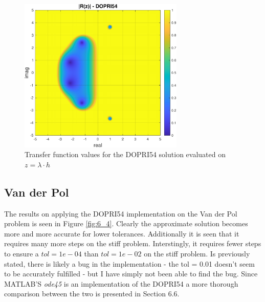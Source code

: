 \begin{figure}[H]
    \centering
    \includegraphics[width=0.7\textwidth]{plots/6_3c.pdf}
    \caption{Transfer function values for the DOPRI54 solution evaluated on $z = \lambda \cdot h$}
    \label{fig:6_3c}
\end{figure}







\subsection{Van der Pol}
The results on applying the DOPRI54 implementation on the Van der Pol problem is seen in Figure \ref{fig:6_4}. Clearly the approximate solution becomes more and more accurate for lower tolerances. Additionally it is seen that it requires many more steps on the stiff problem. Interstingly, it requires fewer steps to ensure a $tol = 1e-04$ than $tol = 1e-02$ on the stiff problem. Is previously stated, there is likely a bug in the implementation - the tol = 0.01 doesn't seem to be accurately fulfilled - but I have simply not been able to find the bug. Since MATLAB'S \textit{ode45} is an implementation of the DOPRI54 a more thorough comparison between the two is presented in Section 6.6.

